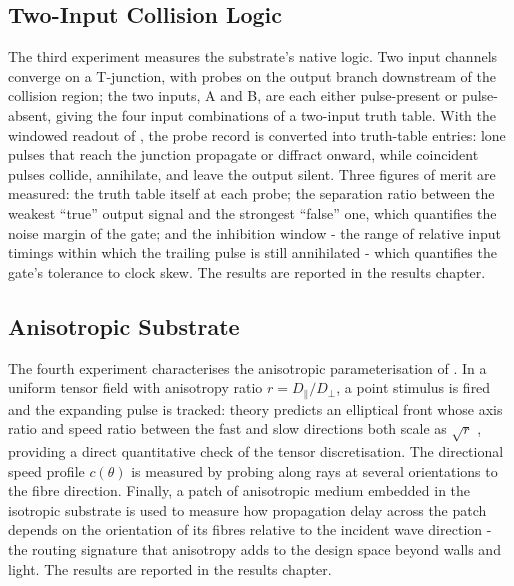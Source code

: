 \subsection{Two-Input Collision Logic}
\label{sec:meth_exp_logic}

The third experiment measures the substrate's native logic. 
Two input channels converge on a T-junction, with probes on the output branch downstream of the collision region; the two inputs, A and B, are each either pulse-present or pulse-absent, giving the four input combinations of a two-input truth table. 
With the windowed readout of , the probe record is converted into truth-table entries: lone pulses that reach the junction propagate or diffract onward, while coincident pulses collide, annihilate, and leave the output silent. 
Three figures of merit are measured: the truth table itself at each probe; the separation ratio between the weakest ``true'' output signal and the strongest ``false'' one, which quantifies the noise margin of the gate; and the inhibition window - the range of relative input timings within which the trailing pulse is still annihilated - which quantifies the gate's tolerance to clock skew. 
The results are reported in the results chapter. 

\subsection{Anisotropic Substrate}
\label{sec:meth_exp_anisotropy}

The fourth experiment characterises the anisotropic parameterisation of . 
In a uniform tensor field with anisotropy ratio $r = D_{\parallel}/D_{\perp}$, a point stimulus is fired and the expanding pulse is tracked: theory predicts an elliptical front whose axis ratio and speed ratio between the fast and slow directions both scale as $\sqrt{r}$ \cite{keener1991eikonal}, providing a direct quantitative check of the tensor discretisation. 
The directional speed profile $c(\theta)$ is measured by probing along rays at several orientations to the fibre direction. 
Finally, a patch of anisotropic medium embedded in the isotropic substrate is used to measure how propagation delay across the patch depends on the orientation of its fibres relative to the incident wave direction - the routing signature that anisotropy adds to the design space beyond walls and light. 
The results are reported in the results chapter. 
